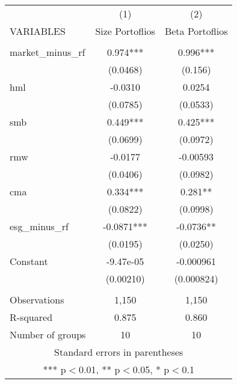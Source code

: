\documentclass[]{article}
\begin{document}
\begin{tabular}{lcc} \hline
 & (1) & (2) \\
VARIABLES & Size Portoflios & Beta Portoflios \\ \hline
 &  &  \\
market\_minus\_rf & 0.974*** & 0.996*** \\
 & (0.0468) & (0.156) \\
hml & -0.0310 & 0.0254 \\
 & (0.0785) & (0.0533) \\
smb & 0.449*** & 0.425*** \\
 & (0.0699) & (0.0972) \\
rmw & -0.0177 & -0.00593 \\
 & (0.0406) & (0.0982) \\
cma & 0.334*** & 0.281** \\
 & (0.0822) & (0.0998) \\
esg\_minus\_rf & -0.0871*** & -0.0736** \\
 & (0.0195) & (0.0250) \\
Constant & -9.47e-05 & -0.000961 \\
 & (0.00210) & (0.000824) \\
 &  &  \\
Observations & 1,150 & 1,150 \\
R-squared & 0.875 & 0.860 \\
 Number of groups & 10 & 10 \\ \hline
\multicolumn{3}{c}{ Standard errors in parentheses} \\
\multicolumn{3}{c}{ *** p$<$0.01, ** p$<$0.05, * p$<$0.1} \\
\end{tabular}
\end{document}
